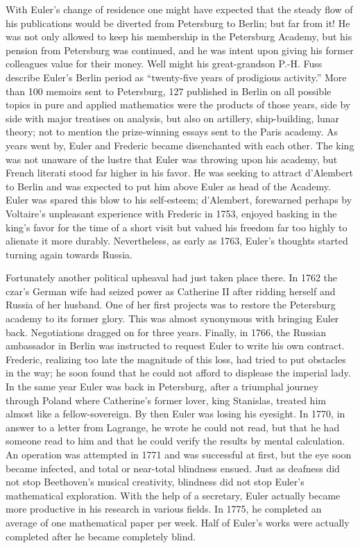 \documentclass[b5paper]{article}
\begin{document}
\begin{mdframed}
With Euler's change of residence one might have expected that the steady flow of his publications would be diverted from Petersburg to Berlin; but far from it! He was not only allowed to keep his membership in the Petersburg Academy, but his pension from Petersburg was continued, and he was intent upon giving his former colleagues value for their money. Well might his great-grandson P.-H. Fuss describe Euler's Berlin period as \enquote{twenty-five years of prodigious activity.} More than 100 memoirs sent to Petersburg, 127 published in Berlin on all possible topics in pure and applied mathematics were the products of those years, side by side with major treatises on analysis, but also on artillery, ship-building, lunar theory; not to mention the prize-winning essays sent to the Paris academy. As years went by, Euler and Frederic became disenchanted with each other. The king was not unaware of the lustre that Euler was throwing upon his academy, but French literati stood far higher in his favor. He was seeking to attract d'Alembert to Berlin and was expected to put him above Euler as head of the Academy. Euler was spared this blow to his self-esteem; d'Alembert, forewarned perhaps by Voltaire's unpleasant experience with Frederic in 1753, enjoyed basking in the king's favor for the time of a short visit but valued his freedom far too highly to alienate it more durably. Nevertheless, as early as 1763, Euler's thoughts started turning again towards Russia.

Fortunately another political upheaval had just taken place there. In 1762 the czar's German wife had seized power as Catherine II after ridding herself and Russia of her husband. One of her first projects was to restore the Petersburg academy to its former glory. This was almost synonymous with bringing Euler back. Negotiations dragged on for three years. Finally, in 1766, the Russian ambassador in Berlin was instructed to request Euler to write his own contract. Frederic, realizing too late the magnitude of this loss, had tried to put obstacles in the way; he soon found that he could not afford to displease the imperial lady. In the same year Euler was back in Petersburg, after a triumphal journey through Poland where Catherine's former lover, king Stanislas, treated him almost like a fellow-sovereign. By then Euler was losing his eyesight. In 1770, in answer to a letter from Lagrange, he wrote he could not read, but that he had someone read to him and that he could verify the results by mental calculation. An operation was attempted in 1771 and was successful at first, but the eye soon became infected, and total or near-total blindness ensued\cite{Weil-1983}. Just as deafness did not stop Beethoven's musical creativity, blindness did not stop Euler's mathematical exploration\cite{HanXueTao2009}. With the help of a secretary, Euler actually became more productive in his research in various fields. In 1775, he completed an average of one mathematical paper per week. Half of Euler's works were actually completed after he became completely blind.


\end{mdframed}
\end{document}
